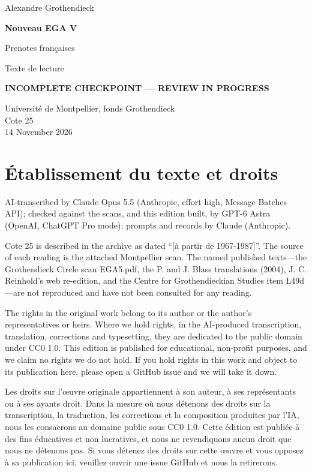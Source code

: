 \documentclass[10pt,a4paper]{article}
\newcommand{\EditionForm}{Texte de lecture}
\begin{document}
\hypersetup{pageanchor=false}\begin{titlepage}\thispagestyle{empty}\vspace*{20mm}
{\Large Alexandre Grothendieck\par}\vspace{12mm}
{\Huge\bfseries Nouveau EGA V\par}\vspace{8mm}
{\Large Prenotes françaises\par}\vspace{7mm}
{\large\EditionForm\par}\vspace{12mm}
{\large\bfseries\color{deletedred}INCOMPLETE CHECKPOINT — REVIEW IN PROGRESS\par}\vspace{10mm}
Université de Montpellier, fonds Grothendieck\\ Cote 25\\
14 November 2026
\vfill\end{titlepage}\clearpage\hypersetup{pageanchor=true}
\section*{Établissement du texte et droits}
AI-transcribed by Claude Opus 5.5 (Anthropic, effort high, Message Batches API); checked against the scans, and this edition built, by GPT-6 Astra (OpenAI, ChatGPT Pro mode); prompts and records by Claude (Anthropic).

Cote 25 is described in the archive as dated ``[à partir de 1967-1987]''. The source of each reading is the attached Montpellier scan. The named published texts---the Grothendieck Circle scan EGA5.pdf, the P. and J. Blass translations (2004), J. C. Reinhold's web re-edition, and the Centre for Grothendieckian Studies item L49d---are not reproduced and have not been consulted for any reading.

The rights in the original work belong to its author or the author's representatives or heirs. Where we hold rights, in the AI-produced transcription, translation, corrections and typesetting, they are dedicated to the public domain under CC0 1.0. This edition is published for educational, non-profit purposes, and we claim no rights we do not hold. If you hold rights in this work and object to its publication here, please open a GitHub issue and we will take it down.

Les droits sur l'œuvre originale appartiennent à son auteur, à ses représentants ou à ses ayants droit. Dans la mesure où nous détenons des droits sur la transcription, la traduction, les corrections et la composition produites par l'IA, nous les consacrons au domaine public sous CC0 1.0. Cette édition est publiée à des fins éducatives et non lucratives, et nous ne revendiquons aucun droit que nous ne détenons pas. Si vous détenez des droits sur cette œuvre et vous opposez à sa publication ici, veuillez ouvrir une issue GitHub et nous la retirerons.
\end{document}
